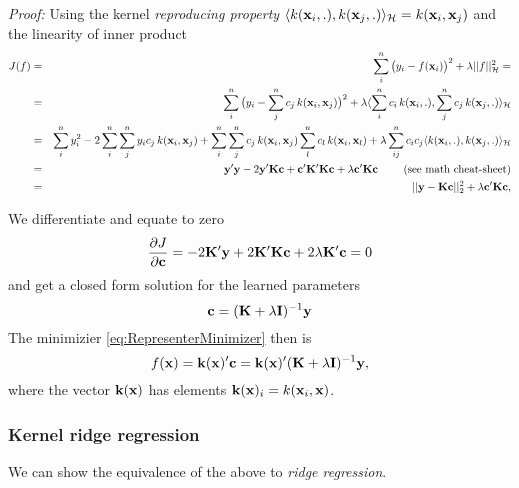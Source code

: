\begin{small}
\emph{Proof:} Using the kernel \emph{reproducing property} $\langle k(\mathbf{x}_i,.), k(\mathbf{x}_j,.) \rangle_\mathcal{H} = k(\mathbf{x}_i,\mathbf{x}_j)$ and the linearity of inner product
\begin{eqnarray*}
J(f) & = & \sum_i^n \big( y_i - f(\mathbf{x}_i) \big)^2 + \lambda ||f||_\mathcal{H}^2  =
 \nonumber \\
 & = & \sum_i^n \big( y_i - \sum_j^n c_j \, k(\mathbf{x}_i,\mathbf{x}_j) \big)^2 + \lambda
\langle \sum_i^n c_i \, k(\mathbf{x}_i,.), \sum_j^n c_j \, k(\mathbf{x}_j,.)
\rangle_\mathcal{H}  \nonumber \\
 & = & \sum_i^n y^2_i - 2 \sum_i^n \sum_j^n y_i  c_j \, k(\mathbf{x}_i,\mathbf{x}_j) + \sum_i^n \sum_j^n c_j \, k(\mathbf{x}_i,\mathbf{x}_j) \sum_l^n c_l \, k(\mathbf{x}_i,\mathbf{x}_l)
+ \lambda \sum_{ij}^n c_i c_j \langle k(\mathbf{x}_i,.), k(\mathbf{x}_j,.)
\rangle_\mathcal{H} \nonumber \\
 & = & \mathbf{y}' \mathbf{y} - 2 \mathbf{y}' \mathbf{K} \mathbf{c} + \mathbf{c}' \mathbf{K}' \mathbf{K} \mathbf{c} +
\lambda \mathbf{c}' \mathbf{K} \mathbf{c} \qquad \text{ (see math cheat-sheet)} \nonumber \\
 & = & ||\mathbf{y} - \mathbf{K} \mathbf{c}||_2^2 +
\lambda \mathbf{c}' \mathbf{K} \mathbf{c},
\end{eqnarray*}
\end{small}

We differentiate and equate to zero
\begin{equation}\label{eq:RKHSJC}
 \frac{\partial{J}}{\partial{\mathbf{c}}} = - 2 \mathbf{K}' \mathbf{y} + 2 \mathbf{K}' \mathbf{K}
\mathbf{c} + 2 \lambda \mathbf{K}' \mathbf{c} = 0 
\end{equation}
and get a closed form solution for the learned parameters 
\begin{equation}\label{eq:SingleCSolution}
 \mathbf{c} = (\mathbf{K} + \lambda \mathbf{I})^{-1} \mathbf{y}
\end{equation}
The minimizier \eqref{eq:RepresenterMinimizer} then is
\begin{equation}\label{eq:KernelSolution}
 f(\mathbf{x}) = \mathbf{k}(\mathbf{x})' \mathbf{c} = \mathbf{k}(\mathbf{x})' (\mathbf{K} + \lambda
\mathbf{I})^{-1} \mathbf{y},
\end{equation}
where the vector $\mathbf{k}(\mathbf{x})$ has elements $\mathbf{k}(\mathbf{x})_i =
k(\mathbf{x}_i,\mathbf{x})$.

\subsubsection{Kernel ridge regression}
We can show the equivalence of the above to \emph{ridge regression}.

